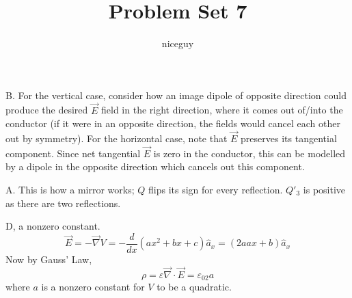 \documentclass[answers]{exam}
\author{niceguy}
\title{Problem Set 7}
\begin{document}
\maketitle

\begin{questions}


\begin{solution}
	B. For the vertical case, consider how an image dipole of opposite direction could produce the desired $\vec{E}$ field in the right direction, where it comes out of/into the conductor (if it were in an opposite direction, the fields would cancel each other out by symmetry). For the horizontal case, note that $\vec{E}$ preserves its tangential component. Since net tangential $\vec{E}$ is zero in the conductor, this can be modelled by a dipole in the opposite direction which cancels out this component.
\end{solution}


\begin{solution}
	A. This is how a mirror works; $Q$ flips its sign for every reflection. $Q'_3$ is positive as there are two reflections.
\end{solution}


\begin{solution}
	D, a nonzero constant.
	$$\vec{E} = -\vec{\nabla}V = -\frac{d}{dx}(ax^2+bx+c)\hat{a}_x = (2aax+b)\hat{a}_x$$
	Now by Gauss' Law,
	$$\rho = \varepsilon\vec{\nabla}\cdot\vec{E} = \varepsilon_02a$$
	where $a$ is a nonzero constant for $V$ to be a quadratic.
\end{solution}


\end{questions}
\end{document}
